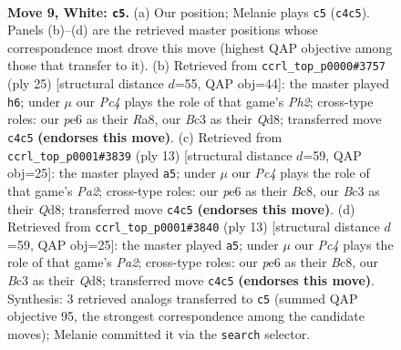 \documentclass[11pt]{article}
\begin{document}
\clearpage

\begin{figure}[p]\centering
\begin{subfigure}{0.46\textwidth}\centering
\resizebox{\linewidth}{!}{%
\newchessgame
\chessboard[
  setfen={1rb2rk1/ppppqppp/2n1pn2/8/2PP4/2B1PNP1/PP3P1P/R2QKB1R w KQ - 1 9},
  showmover=false,
  pgfstyle=straightmove, color=movearrow, markmove={c4-c5}
]}
\caption{}
\end{subfigure}\hfill
\begin{subfigure}{0.46\textwidth}\centering
\resizebox{\linewidth}{!}{%
\newchessgame
\chessboard[
  setfen={r2qkb1r/1p2np1p/p1b1p1p1/3pP3/P2P4/2N2N2/1P3PPP/R1BQ1RK1 b kq - 0 13},
  showmover=false,
  pgfstyle=straightmove, color=movearrow, markmove={h7-h6}
]}
\caption{}
\end{subfigure}
\\[4pt]
\begin{subfigure}{0.46\textwidth}\centering
\resizebox{\linewidth}{!}{%
\newchessgame
\chessboard[
  setfen={r1bqk1nr/ppp2pb1/2np2pp/4p3/2P5/2N2NP1/PP1PPPBP/1RBQ1RK1 b kq - 1 7},
  showmover=false,
  pgfstyle=straightmove, color=movearrow, markmove={a7-a5}
]}
\caption{}
\end{subfigure}\hfill
\begin{subfigure}{0.46\textwidth}\centering
\resizebox{\linewidth}{!}{%
\newchessgame
\chessboard[
  setfen={r1bqk1nr/ppp2pb1/2np2pp/4p3/2P5/2N2NP1/PP1PPPBP/1RBQ1RK1 b kq - 1 7},
  showmover=false,
  pgfstyle=straightmove, color=movearrow, markmove={a7-a5}
]}
\caption{}
\end{subfigure}
\caption{\textbf{Move 9, White: \texttt{c5}.} (a) Our position; Melanie plays \texttt{c5} (\texttt{c4c5}). Panels (b)--(d) are the retrieved master positions whose correspondence most drove this move (highest QAP objective among those that transfer to it). (b) Retrieved from \texttt{ccrl\_top\_p0000\#3757} (ply 25) [structural distance $d$=55, QAP obj=44]: the master played \texttt{h6}; under $\mu$ our \emph{Pc4} plays the role of that game's \emph{Ph2}; cross-type roles: our \emph{p}e6 as their \emph{R}a8, our \emph{B}c3 as their \emph{Q}d8; transferred move \texttt{c4c5} \textbf{(endorses this move)}. (c) Retrieved from \texttt{ccrl\_top\_p0001\#3839} (ply 13) [structural distance $d$=59, QAP obj=25]: the master played \texttt{a5}; under $\mu$ our \emph{Pc4} plays the role of that game's \emph{Pa2}; cross-type roles: our \emph{p}e6 as their \emph{B}c8, our \emph{B}c3 as their \emph{Q}d8; transferred move \texttt{c4c5} \textbf{(endorses this move)}. (d) Retrieved from \texttt{ccrl\_top\_p0001\#3840} (ply 13) [structural distance $d$=59, QAP obj=25]: the master played \texttt{a5}; under $\mu$ our \emph{Pc4} plays the role of that game's \emph{Pa2}; cross-type roles: our \emph{p}e6 as their \emph{B}c8, our \emph{B}c3 as their \emph{Q}d8; transferred move \texttt{c4c5} \textbf{(endorses this move)}. Synthesis: 3 retrieved analogs transferred to \texttt{c5} (summed QAP objective 95, the strongest correspondence among the candidate moves); Melanie committed it via the \texttt{search} selector.}
\label{fig:thought-m16}
\end{figure}
\end{document}
